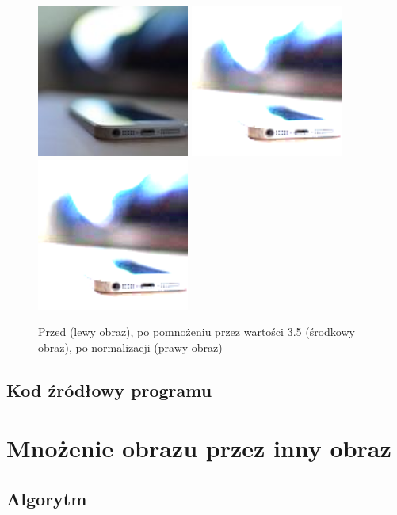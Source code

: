 \documentclass[a4paper,12pt]{book}
\begin{document}
\begin{figure}[H]
	\caption{Przed (lewy obraz), po pomnożeniu przez wartości 3.5 (środkowy obraz), po normalizacji (prawy obraz)}
	\includegraphics[width=5cm, height=5cm]{phone-unmodified.jpg}
	\includegraphics[width=5cm, height=5cm]{3-2/multiply-color-const-phone-35.png}
	\includegraphics[width=5cm, height=5cm]{3-2/multiply-color-const-phone-35-norm.png}
\end{figure}

\subsection*{Kod źródłowy programu}

\section{Mnożenie obrazu przez inny obraz}
\subsection*{Algorytm}
\end{document}
